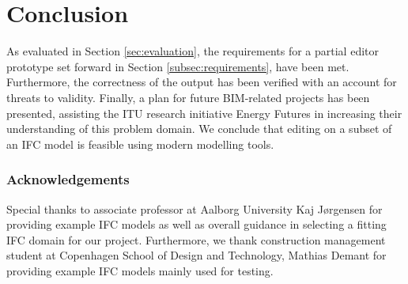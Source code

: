 \section{Conclusion}
\label{sec:conclusion}
As evaluated in Section \ref{sec:evaluation}, the requirements for a partial editor prototype set forward in Section \ref{subsec:requirements}, have been met. Furthermore, the correctness of the output has been verified with an account for threats to validity. Finally, a plan for future BIM-related projects has been presented, assisting the ITU research initiative Energy Futures in increasing their understanding of this problem domain. We conclude that editing on a subset of an IFC model is feasible using modern modelling tools.

\subsubsection{Acknowledgements} Special thanks to associate professor at Aalborg University Kaj Jørgensen for providing example IFC models as well as overall guidance in selecting a fitting IFC domain for our project. Furthermore, we thank construction management student at Copenhagen School of Design and Technology, Mathias Demant for providing example IFC models mainly used for testing.